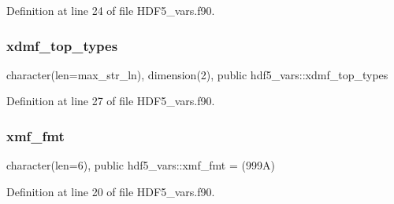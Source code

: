Definition at line 24 of file H\+D\+F5\+\_\+vars.\+f90.

\mbox{\label{namespacehdf5__vars_ad25ea0a5a9a4bb3f9248a7fa61ea1363}} 
\subsubsection{\texorpdfstring{xdmf\+\_\+top\+\_\+types}{xdmf\_top\_types}}
{\footnotesize\ttfamily character(len=max\+\_\+str\+\_\+ln), dimension(2), public hdf5\+\_\+vars\+::xdmf\+\_\+top\+\_\+types}



Definition at line 27 of file H\+D\+F5\+\_\+vars.\+f90.

\mbox{\label{namespacehdf5__vars_ad8665a0387dde737161d1162565aefa9}} 
\subsubsection{\texorpdfstring{xmf\+\_\+fmt}{xmf\_fmt}}
{\footnotesize\ttfamily character(len=6), public hdf5\+\_\+vars\+::xmf\+\_\+fmt = \textquotesingle{}(999\+A)\textquotesingle{}}



Definition at line 20 of file H\+D\+F5\+\_\+vars.\+f90.


